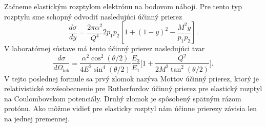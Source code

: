 \documentclass[../../main.tex]{subfiles}
\begin{document}
Začneme elastickým rozptylom elektrónu na bodovom náboji. Pre tento typ rozptylu sme schopný odvodiť nasledujúci účinný prierez
\begin{equation}
 \frac{d\sigma}{dy} = \frac{2\pi \alpha^2}{Q^4}2p_1p_2 \left[ 1+(1-y)^2-\frac{M^2y}{p_1p_2} \right].
\end{equation}
V laboratórnej sústave má tento účinný prierez nasledujúci tvar
\begin{equation}
\frac{d\sigma}{d\Omega_{lab}} = \frac{\alpha^2 \cos^2(\theta/2)}{4E^2\sin^4(\theta/2)} \frac{E_3}{E_1} \bigg[ 1+\frac{Q^2}{2M^2\tan^2(\theta/2)} \bigg].
\end{equation}
V tejto poslednej formule sa prvý zlomok nazýva Mottov účinný prierez, ktorý je relativistické zovšeobecnenie pre Rutherfordov účinný prierez pre elastický rozptyl na Coulombovskom potenciály. Druhý zlomok je spôsobený spätným rázom protónu. Ako môžme vidieť pre elasticky rozptyl nám účinne prierezy závisia len na jednej premennej.
\end{document}
